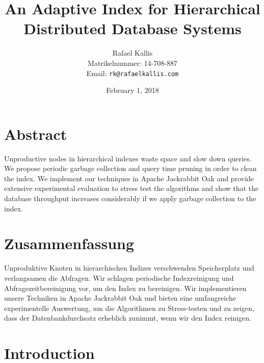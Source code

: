 \documentclass[abstracton,12pt]{scrartcl}
\title{An Adaptive Index for Hierarchical Distributed Database Systems}
\author{
    Rafael Kallis\\[-5pt]
    \scriptsize Matrikelnummer: 14-708-887\\[-5pt]
    \scriptsize Email: \texttt{rk@rafaelkallis.com}
}
\date{\vspace*{2cm}February 1, 2018}
\theoremstyle{definition}
\begin{document}
\maketitle
\thispagestyle{empty}


\newpage
\thispagestyle{empty}
\vspace*{7cm}

\section*{Abstract}

Unproductive nodes in hierarchical indexes waste space and slow down queries.
We propose periodic garbage collection and query time pruning in order to
clean the index. We implement our techniques in Apache Jackrabbit Oak and
provide extensive experimental evaluation to stress test the algorithms and
show that the database throughput increases considerably if we apply garbage
collection to the index.

\newpage
\thispagestyle{empty}
\vspace*{7cm}

\section*{Zusammenfassung}

Unproduktive Knoten in hierarchischen Indizes verschwenden Speicherplatz und
verlangsamen die Abfragen. Wir schlagen periodische Indexreinigung und
Abfragezeitbereinigung vor, um den Index zu bereinigen. Wir implementieren
unsere Techniken in Apache Jackrabbit Oak und bieten eine umfangreiche
experimentelle Auswertung, um die Algorithmen zu Stress-testen und zu zeigen, dass der
Datenbankdurchsatz erheblich zunimmt, wenn wir den Index reinigen.

\newpage
\thispagestyle{empty}

\tableofcontents

\newpage
\thispagestyle{empty}

\listoffigures

\newpage



\section{Introduction}
\end{document}
